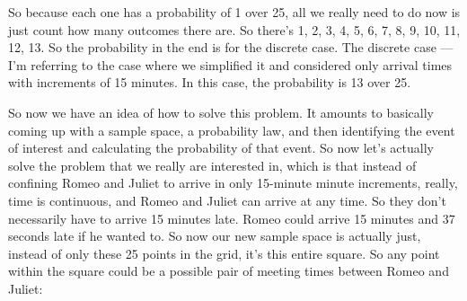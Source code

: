 \documentclass[pdftex, brazil, 12pt, twoside]{article}
\begin{document}
So because each one has a probability of 1 over 25, all
we really need to do now is just count how many
outcomes there are.
So there's 1, 2, 3, 4, 5, 6, 7, 8, 9, 10, 11, 12, 13.
So the probability in the end is for the discrete case.
The discrete case ---
I'm referring to the case where we simplified it and
considered only arrival times with increments of 15 minutes.
In this case, the probability is 13 over 25.

So now we have an idea of how to solve this problem.
It amounts to basically coming up with a sample space, a
probability law, and then identifying the event of
interest and calculating the probability of that event.
So now let's actually solve the problem that we really are
interested in, which is that instead of confining Romeo and
Juliet to arrive in only 15-minute minute increments,
really, time is continuous, and Romeo and Juliet can
arrive at any time.
So they don't necessarily have to arrive 15 minutes late.
Romeo could arrive 15 minutes and 37 seconds late
if he wanted to.
So now our new sample space is actually just, instead of only
these 25 points in the grid, it's this entire square.
So any point within the square could be a possible pair of
meeting times between Romeo and Juliet:

\begin{figure}[H]
  \begin{center}
  \end{center}
\end{figure}
\end{document}
